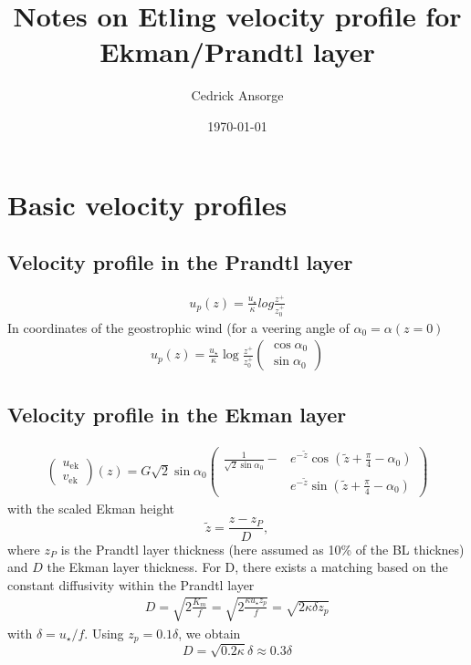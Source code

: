 \documentclass[a4paper,10pt]{amsart}
\author{Cedrick Ansorge}
\date{\today}
\title{Notes on Etling velocity profile for Ekman/Prandtl layer}
\begin{document}
\maketitle


\newcommand{\eqnref}[1]{Eq.~(\ref{eqn:#1})}
\section{Basic velocity profiles} 
\subsection{Velocity profile in the Prandtl layer} 
\begin{align}
  u_p(z) = \frac{u_\star}{\kappa} log \frac{z^+}{z_{0}^{+}}
\end{align}
In coordinates of the geostrophic wind (for a veering angle of $\alpha_0=\alpha(z=0)$
\begin{align}
  u_p(z) =\frac{u_\star}{\kappa } \log\frac{z^+}{z_{0}^{+}}\begin{pmatrix}\cos\alpha_0\\\sin\alpha_0\end{pmatrix} 
\end{align}

\subsection{Velocity profile in the Ekman layer}
\begin{align}
  \begin{pmatrix} u_\text{ek} \\ v_\text{ek}\end{pmatrix}(z) = G\sqrt{2}\sin\alpha_0
  \begin{pmatrix}\frac{1}{\sqrt{2}\sin\alpha_0}- &e^{-\tilde{z}} \cos (\tilde{z} +\frac{\pi}{4} - \alpha_0) \\ 
                                                 &e^{-\tilde{z}} \sin (\tilde{z} +\frac{\pi}{4} - \alpha_0)
  \end{pmatrix} 
\end{align}
with the scaled Ekman height
\[\tilde{z} = \frac{z-z_P}{D}, \]
where $z_P$ is the Prandtl layer thickness (here assumed as 10\% of the BL thicknes)
and $D$ the Ekman layer thickness. For D, there exists a matching based on the constant diffusivity within the Prandtl layer 
\begin{align}
  D = \sqrt{2\frac{K_m}{f}}  = \sqrt{2\frac{\kappa u_\star z_p}{f}} = \sqrt{2\kappa\delta z_p}  
\end{align}
with $\delta=u_\star/f$. Using $z_p=0.1\delta$, we obtain
\[D=\sqrt{0.2\kappa}\delta\approx 0.3\delta\] 
\end{document}
